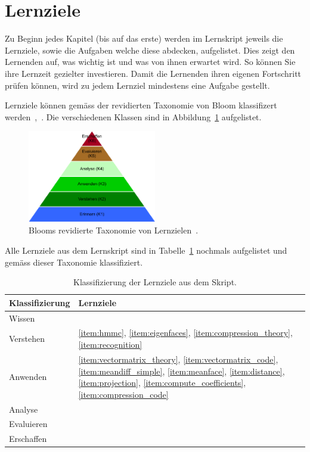 \section{Lernziele}
Zu Beginn jedes Kapitel (bis auf das erste) werden im Lernskript jeweils die Lernziele, sowie die Aufgaben welche diese abdecken, aufgelistet.
Dies zeigt den Lernenden auf, was wichtig ist und was von ihnen erwartet wird.
So können Sie ihre Lernzeit gezielter investieren.
Damit die Lernenden ihren eigenen Fortschritt prüfen können, wird zu jedem Lernziel mindestens eine Aufgabe gestellt.

Lernziele können gemäss der revidierten Taxonomie von Bloom klassifizert werden~\cite{Bloom1956},~\cite{Anderson2001}.
Die verschiedenen Klassen sind in Abbildung~\ref{fig:taxonomie} aufgelistet.
\begin{figure}[ht]
	\centering
	\includegraphics[width=0.5\textwidth]{images/taxonomie}
	\caption{Blooms revidierte Taxonomie von Lernzielen~\cite{Anderson2001}.}
	\label{fig:taxonomie}
\end{figure}
Alle Lernziele aus dem Lernskript sind in Tabelle~\ref{tab:lernziele} nochmals aufgelistet und gemäss dieser Taxonomie klassifiziert.
\begin{table}[ht]
	\centering
	\begin{tabular}{|l|l|}
		\hline
		Klassifizierung & Lernziele \\ \hline
		Wissen &  \\
		Verstehen & \ref{item:hmmc}, \ref{item:eigenfaces}, \ref{item:compression_theory}, \ref{item:recognition}  \\
		Anwenden & \ref{item:vectormatrix_theory}, \ref{item:vectormatrix_code}, \ref{item:meandiff_simple}, \ref{item:meanface}, \ref{item:distance}, \ref{item:projection}, \ref{item:compute_coefficients}, \ref{item:compression_code}  \\
		Analyse &  \\
		Evaluieren &  \\
		Erschaffen &  \\
		\hline
	\end{tabular} %
	\caption{Klassifizierung der Lernziele aus dem Skript.}
	\label{tab:lernziele} 
\end{table}